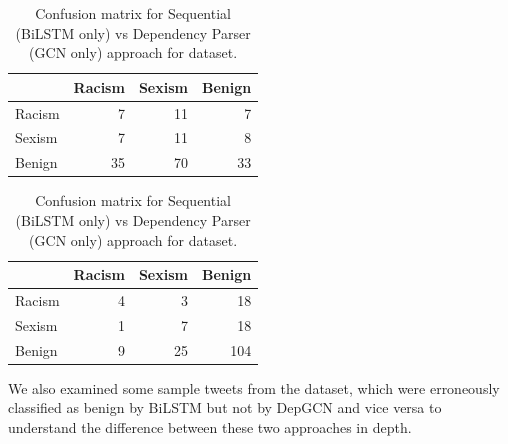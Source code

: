 \begin{table}[tbh]
  \small
  \begin{subtable}{0.5\linewidth}
    \centering
\begin{tabular}{ l  r  r r }
\toprule %
  &  Racism & Sexism & Benign  \\ %
  \midrule
 Racism & 7 & 11 & 7 \\
 Sexism & 7 & 11 & 8 \\
 Benign & 35 & 70 & 33 \\
 \bottomrule %
\end{tabular}
\caption{Dependency Parser model}
\end{subtable}%
\begin{subtable}{0.5\linewidth}
  \centering
\begin{tabular}{ l  r  r r }
\toprule %
&  Racism & Sexism & Benign  \\
\midrule
Racism & 4 & 3 & 18 \\
Sexism & 1 & 7 & 18 \\
Benign & 9 & 25 & 104 \\
\bottomrule %
\end{tabular}
\caption{Sequential Model}
\end{subtable}
\caption{\label{tab:confusion} Confusion matrix for Sequential (BiLSTM only) vs Dependency Parser (GCN only) approach for \citet{waseem-hovy-2016} dataset.}
\end{table}

We also examined some sample tweets from the \citet{waseem-hovy-2016} dataset, which were erroneously classified as benign by BiLSTM but not by DepGCN and vice versa to understand the difference between these two approaches in depth.

